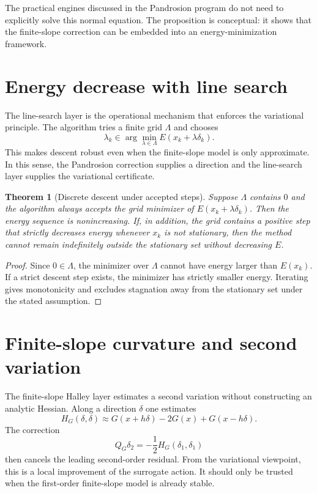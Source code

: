 \documentclass[11pt]{article}
\newtheorem{theorem}[definition]{Theorem}
\begin{document}
The practical engines discussed in the Pandrosion program do not need to explicitly solve this normal equation.  The proposition is conceptual: it shows that the finite-slope correction can be embedded into an energy-minimization framework.

\section{Energy decrease with line search}
The line-search layer is the operational mechanism that enforces the variational principle.  The algorithm tries a finite grid $\Lambda$ and chooses
\[
        \lambda_k\in\arg\min_{\lambda\in\Lambda} E(x_k+\lambda\delta_k).
\]
This makes descent robust even when the finite-slope model is only approximate.  In this sense, the Pandrosion correction supplies a direction and the line-search layer supplies the variational certificate.

\begin{theorem}[Discrete descent under accepted steps]
Suppose $\Lambda$ contains $0$ and the algorithm always accepts the grid minimizer of $E(x_k+\lambda\delta_k)$.  Then the energy sequence is nonincreasing.  If, in addition, the grid contains a positive step that strictly decreases energy whenever $x_k$ is not stationary, then the method cannot remain indefinitely outside the stationary set without decreasing $E$.
\end{theorem}
\begin{proof}
Since $0\in\Lambda$, the minimizer over $\Lambda$ cannot have energy larger than $E(x_k)$.  If a strict descent step exists, the minimizer has strictly smaller energy.  Iterating gives monotonicity and excludes stagnation away from the stationary set under the stated assumption.
\end{proof}

\section{Finite-slope curvature and second variation}
The finite-slope Halley layer estimates a second variation without constructing an analytic Hessian.  Along a direction $\delta$ one estimates
\[
        H_G(\delta,\delta)\approx G(x+h\delta)-2G(x)+G(x-h\delta).
\]
The correction
\[
        Q_G\delta_2=-\frac12 H_G(\delta_1,\delta_1)
\]
then cancels the leading second-order residual.  From the variational viewpoint, this is a local improvement of the surrogate action.  It should only be trusted when the first-order finite-slope model is already stable.
\end{document}
